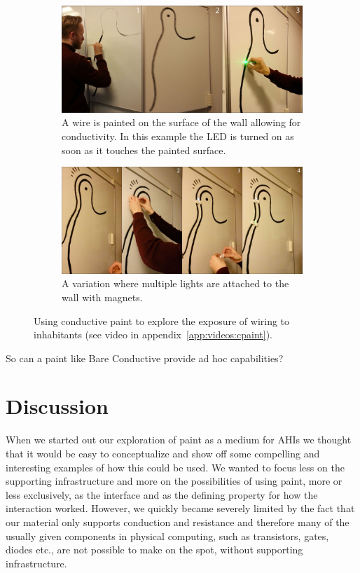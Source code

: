 \begin{figure}[h]
  \centering
  \begin{subfigure}[t]{.9\textwidth}
    \centering
    \includegraphics[width=.9\textwidth]{figures/proto3/wallpaint-1}
    \caption{A wire is painted on the surface of the wall allowing for conductivity. In this example the LED is turned on as soon as it touches the painted surface.}
  \end{subfigure}
  \begin{subfigure}[t]{.9\textwidth}
    \vspace{0.2cm}
    \centering
    \includegraphics[width=.9\textwidth]{figures/proto3/wallpaint-2}
    \caption{A variation where multiple lights are attached to the wall with magnets.}
  \end{subfigure}
  \caption{Using conductive paint to explore the exposure of wiring to inhabitants (see video in appendix~\ref{app:videos:cpaint}).}
  \label{fig:ch:proto3:wallpaint}
\end{figure}

So can a paint like Bare Conductive provide ad hoc capabilities?

\section{Discussion}
When we started out our exploration of paint as a medium for AHIs we thought that it would be easy to conceptualize and show off some compelling and interesting examples of how this could be used.
We wanted to focus less on the supporting infrastructure and more on the possibilities of using paint, more or less exclusively, as the interface and as the defining property for how the interaction worked. 
However, we quickly became severely limited by the fact that our material only supports conduction and resistance and therefore many of the usually given components in physical computing, such as transistors, gates, diodes etc., are not possible to make on the spot, without supporting infrastructure.  

